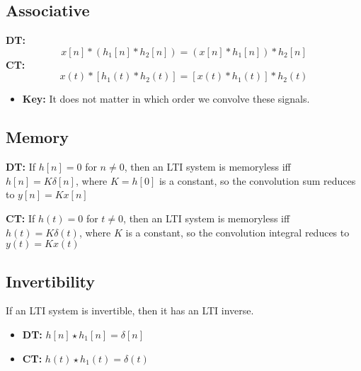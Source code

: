 \subsection{Associative}
\begin{definition}

    \textbf{DT:}
    \begin{equation}
        x[n] * (h_1[n] * h_2[n]) = (x[n] * h_1[n]) * h_2[n]
    \end{equation}
    \textbf{CT:}
    \begin{equation}
        x(t) * [h_1(t) * h_2(t)] = [x(t) * h_1(t)] * h_2(t)
    \end{equation}
    \begin{itemize}
        \item \textbf{Key:} It does not matter in which order we convolve these signals.
    \end{itemize}
\end{definition}

\subsection{Memory}
\begin{definition}
    
    \textbf{DT:} If $h[n] = 0$ for $n \neq 0$, then an LTI system is memoryless iff $h[n] = K\delta[n]$, where $K=h[0]$ is a constant, so the convolution sum reduces to $y[n] = Kx[n]$
    \vspace{1em}

    \textbf{CT:} If $h(t)=0$ for $t \neq 0$, then an LTI system is memoryless iff $h(t)=K\delta(t)$, where $K$ is a constant, so the convolution integral reduces to $y(t) = Kx(t)$
\end{definition}

\subsection{Invertibility}
\begin{definition}
    If an LTI system is invertible, then it has an LTI inverse.


    \begin{itemize}
        \item \textbf{DT:} $h[n] \star h_1[n] = \delta[n]$
        \item \textbf{CT:} $h(t) \star h_1(t) = \delta(t)$
    \end{itemize}
    
\end{definition}

